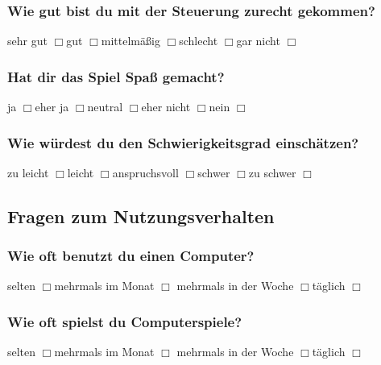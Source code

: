 \subsubsection*{Wie gut bist du mit der Steuerung zurecht gekommen?}
\noindent
sehr gut $\Box{}$\hspace{0.5cm}gut $\Box{}$\hspace{0.5cm}mittelmäßig
$\Box{}$\hspace{0.5cm}schlecht $\Box{}$\hspace{0.5cm}gar nicht $\Box{}$

\subsubsection*{Hat dir das Spiel Spaß gemacht?}
\noindent
ja $\Box{}$\hspace{0.5cm}eher ja $\Box{}$\hspace{0.5cm}neutral
$\Box{}$\hspace{0.5cm}eher nicht $\Box{}$\hspace{0.5cm}nein $\Box{}$

\subsubsection*{Wie würdest du den Schwierigkeitsgrad einschätzen?}
\noindent
zu leicht $\Box{}$\hspace{0.5cm}leicht $\Box{}$\hspace{0.5cm}anspruchsvoll
$\Box{}$\hspace{0.5cm}schwer $\Box{}$\hspace{0.5cm}zu schwer $\Box{}$

\newpage
\subsection*{Fragen zum Nutzungsverhalten}

\subsubsection*{Wie oft benutzt du einen Computer?}
\noindent
selten $\Box{}$\hspace{0.5cm}mehrmals im Monat $\Box{}$\hspace{0.5cm}
mehrmals in der Woche $\Box{}$\hspace{0.5cm}täglich $\Box{}$

\subsubsection*{Wie oft spielst du Computerspiele?}
\noindent
selten $\Box{}$\hspace{0.5cm}mehrmals im Monat $\Box{}$\hspace{0.5cm}
mehrmals in der Woche $\Box{}$\hspace{0.5cm}täglich $\Box{}$

